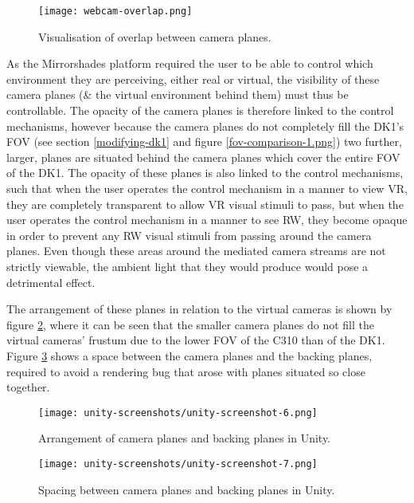 \begin{figure}[h]
	\begin{center}
		\texttt{[image: webcam-overlap.png]}
		\caption{Visualisation of overlap between camera planes.}
		\label{webcam-overlap.png}
	\end{center}
\end{figure}

As the Mirrorshades platform required the user to be able to control which environment they are perceiving, either real or virtual, the visibility of these camera planes (\& the virtual environment behind them) must thus be controllable. The opacity of the camera planes is therefore linked to the control mechanisms, however because the camera planes do not completely fill the DK1's FOV (see section \ref{modifying-dk1} and figure \ref{fov-comparison-1.png}) two further, larger, planes are situated behind the camera planes which cover the entire FOV of the DK1. The opacity of these planes is also linked to the control mechanisms, such that when the user operates the control mechanism in a manner to view VR, they are completely transparent to allow VR visual stimuli to pass, but when the user operates the control mechanism in a manner to see RW, they become opaque in order to prevent any RW visual stimuli from passing around the camera planes. Even though these areas around the mediated camera streams are not strictly viewable, the ambient light that they would produce would pose a detrimental effect.

The arrangement of these planes in relation to the virtual cameras is shown by figure \ref{unity-screenshot-6.png}, where it can be seen that the smaller camera planes do not fill the virtual cameras' frustum due to the lower FOV of the C310 than of the DK1. Figure \ref{unity-screenshot-7.png} shows a space between the camera planes and the backing planes, required to avoid a rendering bug that arose with planes situated so close together.

\begin{figure}[h]
	\begin{center}
		\texttt{[image: unity-screenshots/unity-screenshot-6.png]}
		\caption{Arrangement of camera planes and backing planes in Unity.}
		\label{unity-screenshot-6.png}
	\end{center}
\end{figure}

\begin{figure}[h]
	\begin{center}
		\texttt{[image: unity-screenshots/unity-screenshot-7.png]}
		\caption{Spacing between camera planes and backing planes in Unity.}
		\label{unity-screenshot-7.png}
	\end{center}
\end{figure}

